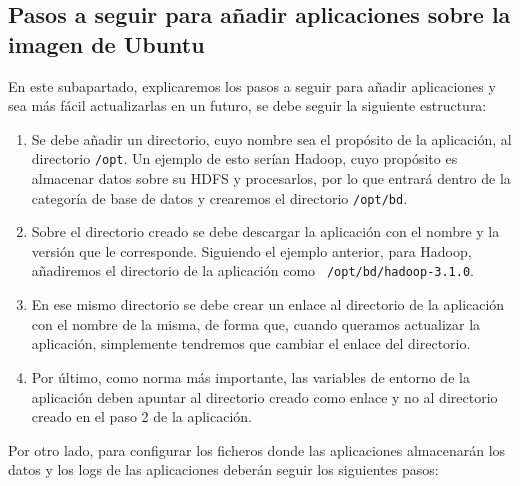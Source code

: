 \subsection{Pasos a seguir para añadir aplicaciones sobre la imagen de
  Ubuntu\label{pasosUbuntu}}

En este subapartado, explicaremos los pasos a seguir para añadir
aplicaciones y sea más fácil actualizarlas en un futuro, se debe seguir la
siguiente estructura:

\begin{enumerate}
\item Se debe añadir un directorio, cuyo nombre sea el propósito de la
  aplicación, al directorio {\tt /opt}. Un ejemplo de esto serían Hadoop,
  cuyo propósito es almacenar datos sobre su HDFS y procesarlos, por lo que
  entrará dentro de la categoría de base de datos y crearemos el directorio
  {\tt /opt/bd}.

\item Sobre el directorio creado se debe descargar la aplicación con el
  nombre y la versión que le corresponde. Siguiendo el ejemplo anterior,
  para Hadoop, añadiremos el directorio de la aplicación como {\tt
    /opt/bd/hadoop-3.1.0}.

\item En ese mismo directorio se debe crear un enlace al directorio de la
  aplicación con el nombre de la misma, de forma que, cuando queramos
  actualizar la aplicación, simplemente tendremos que cambiar el enlace del
  directorio.

\item Por último, como norma más importante, las variables de entorno de la
  aplicación deben apuntar al directorio creado como enlace y no al
  directorio creado en el paso 2 de la aplicación.
\end{enumerate}

Por otro lado, para configurar los ficheros donde las aplicaciones
almacenarán los datos y los logs de las aplicaciones deberán seguir los
siguientes pasos:

